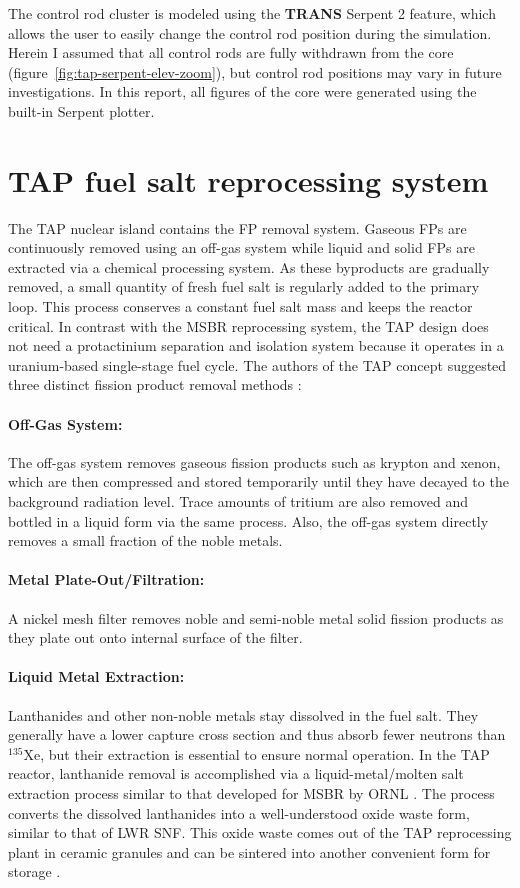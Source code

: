 The control rod cluster is modeled using the \textbf{TRANS} Serpent 2 feature, 
which allows the user to easily change the control rod position during the 
simulation. Herein I assumed that all control rods are fully withdrawn from 
the core (figure~\ref{fig:tap-serpent-elev-zoom}), but control rod 
positions may vary in future investigations.
In this report, all figures of 
the core were generated using the built-in Serpent plotter.

\section{TAP fuel salt reprocessing system}
The \gls{TAP} nuclear island contains the \gls{FP} removal system. Gaseous  
\glspl{FP} are continuously removed using an off-gas system while liquid and 
solid \glspl{FP} are extracted via a chemical processing system. As these 
byproducts are gradually removed, a small quantity of fresh fuel salt is 
regularly added to the primary loop. This process conserves a constant fuel 
salt mass and keeps the reactor critical. In contrast with the \gls{MSBR} 
reprocessing system, the \gls{TAP} design does not need a protactinium 
separation and isolation system because it operates in a uranium-based 
single-stage fuel cycle. The authors of the \gls{TAP} concept suggested three 
distinct fission product removal methods 
\cite{transatomic_power_corporation_neutronics_2016}:
\paragraph{Off-Gas System:} The off-gas system removes gaseous fission 
products such as krypton and xenon, which are then compressed and stored 
temporarily until they have decayed to the background radiation level. Trace 
amounts of tritium are also removed and bottled in a liquid form via the same 
process. Also, the off-gas system directly removes a small fraction of the 
noble metals.
\paragraph{Metal Plate-Out/Filtration:} A nickel mesh filter removes noble and 
semi-noble metal solid fission products as they plate out onto internal surface
of the filter.
\paragraph{Liquid Metal Extraction:} Lanthanides and other non-noble metals 
stay dissolved in the fuel salt. They generally have a lower capture cross 
section and thus absorb fewer neutrons than $^{135}$Xe, but their extraction 
is essential to ensure normal operation. In the \gls{TAP} reactor, lanthanide 
removal is accomplished via a liquid-metal/molten salt extraction process 
similar to that developed for \gls{MSBR} by \gls{ORNL}  
\cite{robertson_conceptual_1971}. The process converts the dissolved 
lanthanides into a well-understood oxide waste form, similar to that of 
\gls{LWR} \gls{SNF}. This oxide waste comes out of the \gls{TAP} reprocessing 
plant in ceramic granules and can be sintered into another convenient form for 
storage \cite{transatomic_power_corporation_technical_2016}.

